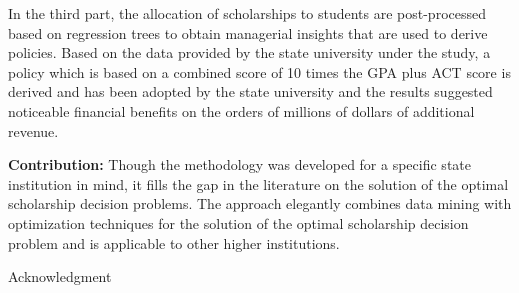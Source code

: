 \documentclass[12pt,english]{report}
\begin{document}
In the third part, the allocation of scholarships to students are
post-processed based on regression trees to obtain managerial insights that are
used to derive policies.  Based on the data provided  by the state university
under the study, a policy which is based on a combined score of 10 times the
GPA plus ACT score is derived and has been adopted by the state university and
the results suggested noticeable financial benefits on the orders of millions
of dollars of additional revenue.

\vspace*{.15in} %
\noindent \textbf{Contribution:} Though the methodology was developed for a
specific state institution in mind, it fills the gap in the literature on the
solution of the optimal scholarship decision problems.  The approach elegantly
combines data mining with optimization techniques for the solution of the
optimal scholarship decision problem and is applicable to other higher
institutions.

\newpage 

\begin{doublespace}
	\tableofcontents
	\listoffigures
	\listoftables
\end{doublespace}
%
\newpage
\thispagestyle{plain}
\setlength{\parindent}{0em}
\begin{center}
	{\huge Acknowledgment}
\end{center}
\end{document}
